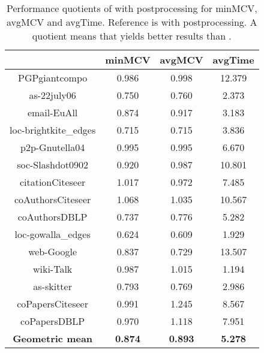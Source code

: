\documentclass[pdftex]{llncs}
\numberwithin{equation}{section}
\numberwithin{example}{section}
\numberwithin{table}{section}
\begin{document}
\begin{table}[tb]
  \caption{Performance quotients of  with postprocessing for minMCV, avgMCV
    and avgTime. Reference is  with postprocessing. A quotient  means that
     yields better results than .}
\begin{center}
\begin{tabular}{ c | c  c | c }
& minMCV  & avgMCV & avgTime\\
                        \hline \hline
PGPgiantcompo           &  0.986              &  0.998               &  12.379              \\ \hline
as-22july06             &  0.750              &  0.760               &   2.373              \\ \hline
email-EuAll             &  0.874              &  0.917               &   3.183              \\ \hline
loc-brightkite\_edges   &  0.715              &  0.715               &   3.836              \\ \hline
p2p-Gnutella04          &  0.995              &  0.995               &   6.670              \\ \hline
soc-Slashdot0902        &  0.920              &  0.987               &  10.801              \\ \hline
citationCiteseer        &  1.017              &  0.972               &   7.485              \\ \hline
coAuthorsCiteseer       &  1.068              &  1.035               &  10.567              \\ \hline 
coAuthorsDBLP           &  0.737              &  0.776               &   5.282              \\ \hline
loc-gowalla\_edges      &  0.624              &  0.609               &   1.929              \\ \hline
web-Google              &  0.837              &  0.729               &  13.507              \\ \hline
wiki-Talk               &  0.987              &  1.015               &   1.194              \\ \hline
as-skitter              &  0.793              &  0.769               &   2.986              \\ \hline
coPapersCiteseer        &  0.991              &  1.245               &   8.567              \\ \hline
coPapersDBLP            &  0.970              &  1.118               &   7.951              \\ \hline  \hline
\textbf{Geometric mean} &  \textbf{0.874}     &  \textbf{0.893}      &\textbf{5.278}        \\ \hline
\end{tabular}
\end{center}
\label{tab:MCV_100}
\end{table}
\end{document}
